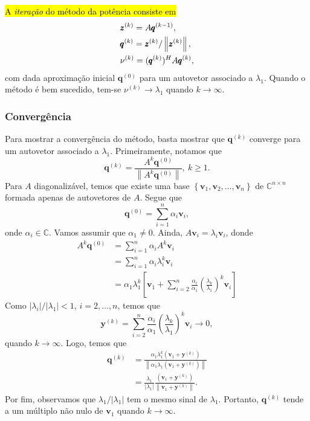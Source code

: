 \hl{A \emph{iteração} do método da potência consiste em}
\begin{align}\hleq
  & \pmb{z}^{(k)} = A\pmb{q}^{(k-1)},\\
  & \pmb{q}^{(k)} = \pmb{z}^{(k)}/\left\|\pmb{z}^{(k)}\right\|,\\
  & \nu^{(k)} = (\pmb{q}^{(k)})^H A \pmb{q}^{(k)},
\end{align}
com dada aproximação inicial $\pmb{q}^{(0)}$ para um autovetor associado a $\lambda_1$. Quando o método é bem sucedido, tem-se $\nu^{(k)}\to \lambda_1$ quando $k\to\infty$.

\subsubsection{Convergência}

Para mostrar a convergência do método, basta mostrar que $\pmb{q}^{(k)}$ converge para um autovetor associado a $\lambda_1$. Primeiramente, notamos que
\begin{equation}
  \pmb{q}^{(k)} = \frac{A^k\pmb{q}^{(0)}}{\left\|A^k\pmb{q}^{(0)}\right\|}, ~k\geq 1.
\end{equation}
Para $A$ diagonalizável, temos que existe uma base $\left\{\pmb{v}_1, \pmb{v}_2, \dotsc, \pmb{v}_n\right\}$ de $\mathbb{C}^{n\times n}$ formada apenas de autovetores de $A$. Segue que
\begin{equation}\label{eq:q0_comblin}
  \pmb{q}^{(0)} = \sum_{i=1}^n \alpha_i \pmb{v}_i,
\end{equation}
onde $\alpha_i\in\mathbb{C}$. Vamos assumir que $\alpha_1\neq 0$. Ainda, $A\pmb{v}_i = \lambda_i \pmb{v}_i$, donde
\begin{align}
  A^k\pmb{q}^{(0)} &= \sum_{i=1}^n \alpha_iA^k\pmb{v}_i\\
             &= \sum_{i=1}^n \alpha_i\lambda_i^k\pmb{v}_i\\
             &= \alpha_1\lambda_1^k\left[\pmb{v}_1 + \sum_{i=2}^n\frac{\alpha_i}{\alpha_1}\left(\frac{\lambda_k}{\lambda_1}\right)^k\pmb{v}_i\right]
\end{align}
Como $|\lambda_i|/|\lambda_1| < 1$, $i=2,\dotsc,n$, temos que
\begin{equation}
  \pmb{y}^{(k)} = \sum_{i=2}^n\frac{\alpha_i}{\alpha_1}\left(\frac{\lambda_k}{\lambda_1}\right)^k\pmb{v}_i \to 0,
\end{equation}
quando $k\to \infty$. Logo, temos que
\begin{align}
  \pmb{q}^{(k)} &= \frac{\alpha_1\lambda_1^k\left(\pmb{v}_1+\pmb{y}^{(k)}\right)}{\left\|\alpha_1\lambda_1\left(\pmb{v}_1+\pmb{y}^{(k)}\right)\right\|}\\
          &= \frac{\lambda_1}{|\lambda_1|}\frac{\left(\pmb{v}_1+\pmb{y}^{(k)}\right)}{\left\|\pmb{v}_1+\pmb{y}^{(k)}\right\|}.
\end{align}
Por fim, observamos que $\lambda_1/|\lambda_1|$ tem o mesmo sinal de $\lambda_1$. Portanto, $\pmb{q}^{(k)}$ tende a um múltiplo não nulo de $\pmb{v}_1$ quando $k\to\infty$.


